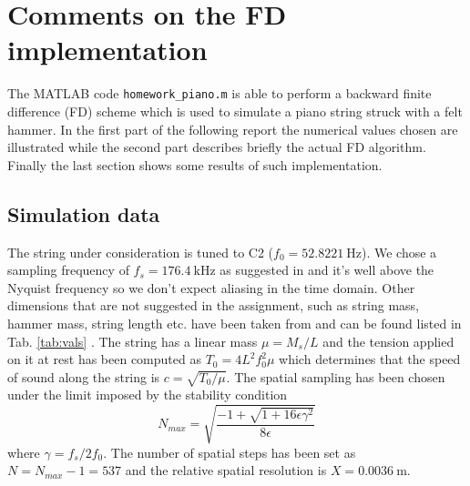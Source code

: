 \documentclass[a4paper]{article}
\begin{document}
\section{Comments on the FD implementation}
The MATLAB code \verb|homework_piano.m| is able to perform a backward finite difference (FD) scheme which is used to simulate a piano string struck with a felt hammer. In the first part of the following report the numerical values chosen are illustrated while the second part describes briefly the actual FD algorithm. Finally the last section shows some results of such implementation.

\subsection{Simulation data}
  The string under consideration is tuned to C2 ($f_0 = \SI{52.8221}{\hertz}$). We chose a sampling frequency of $f_s = \SI{176.4}{\kilo\hertz}$ as suggested in \cite{saitis} and it's well above the Nyquist frequency so we don't expect aliasing in the time domain. Other dimensions that are not suggested in the assignment, such as string mass, hammer mass, string length etc. have been taken from \cite{saitis} and can be found listed in Tab. \ref{tab:vals} . The string has a linear mass $\mu = M_s / L$ and the tension applied on it at rest has been computed as $T_0 = 4L^2f_0^2\mu$ which determines that the speed of sound along the string is $c = \sqrt{T_0/\mu}$. The spatial sampling has been chosen under the limit imposed by the stability condition \cite{chaigne} $$ N_{max} = \sqrt{\frac{-1 + \sqrt{1 + 16 \epsilon \gamma ^2}}{8 \epsilon}} $$ where $\gamma = f_s / 2 f_0 $. The number of spatial steps has been set as $N = N_{max} -1 = 537$ and the relative spatial resolution is $X = \SI{0.0036}{\meter}$. 
\end{document}
